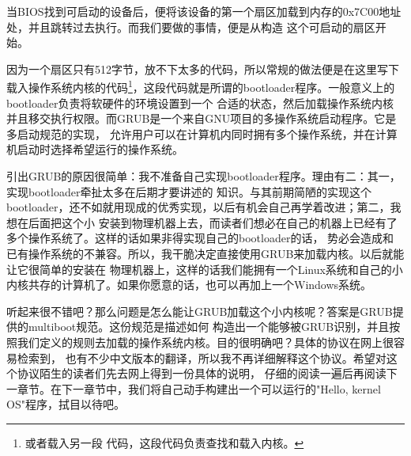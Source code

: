 \par 当BIOS找到可启动的设备后，便将该设备的第一个扇区加载到内存的0x7C00地址处，并且跳转过去执行。而我们要做的事情，便是从构造\allowbreak
这个可启动的扇区开始。

\par 因为一个扇区只有512字节，放不下太多的代码，所以常规的做法便是在这里写下载入操作系统内核的代码\footnote{或者载入另一段\allowbreak
代码，这段代码负责查找和载入内核。}，这段代码就是所谓的bootloader程序。一般意义上的bootloader负责将软硬件的环境设置到一个\allowbreak
合适的状态，然后加载操作系统内核并且移交执行权限。而GRUB是一个来自GNU项目的多操作系统启动程序。它是多启动规范的实现，\allowbreak
允许用户可以在计算机内同时拥有多个操作系统，并在计算机启动时选择希望运行的操作系统。

\par 引出GRUB的原因很简单：我不准备自己实现bootloader程序。理由有二：其一，实现bootloader牵扯太多在后期才要讲述的\allowbreak
知识。与其前期简陋的实现这个bootloader，还不如就用现成的优秀实现，以后有机会自己再学着改进；第二，我想在后面把这个小\allowbreak
安装到物理机器上去，而读者们想必在自己的机器上已经有了多个操作系统了。这样的话如果非得实现自己的bootloader的话，\allowbreak
势必会造成和已有操作系统的不兼容。所以，我干脆决定直接使用GRUB来加载内核。以后就能让它很简单的安装在\allowbreak
物理机器上，这样的话我们能拥有一个Linux系统和自己的小内核共存的计算机了。如果你愿意的话，也可以再加上一个Windows系统。

\par 听起来很不错吧？那么问题是怎么能让GRUB加载这个小内核呢？答案是GRUB提供的multiboot规范。这份规范是描述如何\allowbreak
构造出一个能够被GRUB识别，并且按照我们定义的规则去加载的操作系统内核。目的很明确吧？具体的协议在网上很容易检索到，\allowbreak
也有不少中文版本的翻译，所以我不再详细解释这个协议。希望对这个协议陌生的读者们先去网上得到一份具体的说明，\allowbreak
仔细的阅读一遍后再阅读下一章节。在下一章节中，我们将自己动手构建出一个可以运行的"Hello, kernel OS"程序，拭目以待吧。

